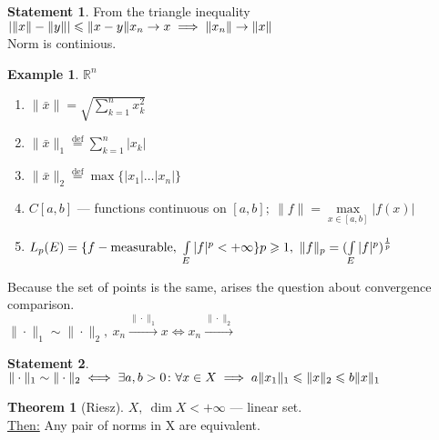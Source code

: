 \documentclass[12pt, fleqn]{article}
\theoremstyle{definition}
\newtheorem{ex}{Example}
\theoremstyle{break}
\newtheorem{thm}{Theorem}[section]
\theoremstyle{theorem}
\newtheorem{stm}{Statement}[section]
\renewcommand\leq{\leqslant}
\renewcommand\geq{\geqslant}
\newcommand{\defeq}{\overset{\text{def}}{=}}
\newcommand{\R}{\mathbb{R}}
\begin{document}
\begin{stm}
  From the triangle inequality $|\|x\| - \|y\|| \leq \|x - y\| \\
  x_n \to x \implies \|x_n\| \to \|x\|$ \\
  Norm is continious.
\end{stm}
\begin{ex}
  $\R^n$ 
  \begin{enumerate}
  \item $\|\bar{x}\| = \sqrt{\sum\limits_{k = 1}^n x_k^2}$
  \item $\|\bar{x}\|_1 \defeq \sum\limits_{k = 1}^n|x_k|$
  \item $\|\bar{x}\|_2 \defeq \max \{|x_1| \dotso |x_n|\}$
  \item $C[a, b]$ --- functions continuous on $[a, b];\ \|f\| = \max\limits_{x \in [a, b]}|f(x)|$ 
  \item $L_p (E) = \{f - \textnormal{measurable},\ \int\limits_E |f|^p < +
    \infty\}\\p \geq 1,\ \|f\|_p = (\int\limits_E |f|^p)^{\frac 1p}$
  \end{enumerate}
\end{ex}
Because the set of points is the same, arises the question about convergence
comparison. \\
$\|\cdot\|_1 \sim \|\cdot\|_2,\ x_n \overset{\|\cdot\|_1}{\to} x \iff x_n \overset{\|\cdot\|_2}{\to}$
\begin{stm}
  $\\\|\cdot\|_1 \sim \|\cdot\|_2 \iff \exists a, b > 0\colon \forall x \in X
  \implies a\|x_1\|_1 \leq \|x\|_2 \leq b \|x\|_1$
\end{stm}
\begin{thm}[Riesz]
  $X,\ \dim{X} < +\infty$ --- linear set. \\
  \underline{Then:} Any pair of norms in X are equivalent.
\end{thm}
\end{document}
